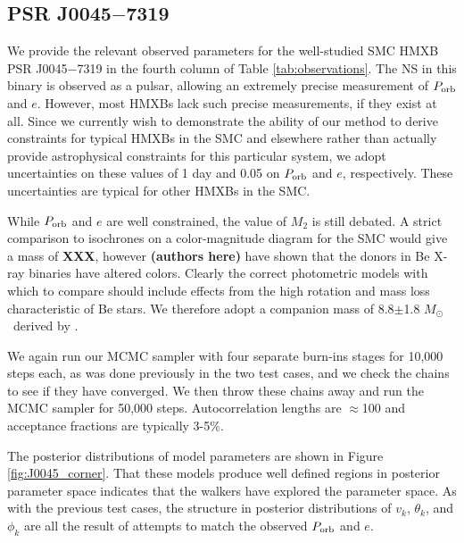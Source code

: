 \documentclass[12pt, preprint]{aastex}
\newcommand{\Msun}{\ifmmode {M_{\odot}}\else${M_{\odot}}$\fi}
\begin{document}
\subsection{PSR J0045$-$7319}


We provide the relevant observed parameters for the well-studied SMC HMXB PSR J0045$-$7319 in the fourth column of Table \ref{tab:observations}. The NS in this binary is observed as a pulsar, allowing an extremely precise measurement of $P_{\rm orb}$ and $e$. However, most HMXBs lack such precise measurements, if they exist at all. Since we currently wish to demonstrate the ability of our method to derive constraints for typical HMXBs in the SMC and elsewhere rather than actually provide astrophysical constraints for this particular system, we adopt uncertainties on these values of 1 day and 0.05 on $P_{\rm orb}$ and $e$, respectively. These uncertainties are typical for other HMXBs in the SMC. 

While $P_{\rm orb}$ and $e$ are well constrained, the value of $M_2$ is still debated. A strict comparison to isochrones on a color-magnitude diagram for the SMC would give a mass of {\bf XXX}, however {\bf (authors here)} have shown that the donors in Be X-ray binaries have altered colors. Clearly the correct photometric models with which to compare should include effects from the high rotation and mass loss characteristic of Be stars. We therefore adopt a companion mass of 8.8$\pm$1.8 \Msun\ derived by \citet{bell95}.

We again run our MCMC sampler with four separate burn-ins stages for 10,000 steps each, as was done previously in the two test cases, and we check the chains to see if they have converged. We then throw these chains away and run the MCMC sampler for 50,000 steps. Autocorrelation lengths are $\approx$100 and acceptance fractions are typically 3-5\%. 

The posterior distributions of model parameters are shown in Figure \ref{fig:J0045_corner}. That these models produce well defined regions in posterior parameter space indicates that the walkers have explored the parameter space. As with the previous test cases, the structure in posterior distributions of $v_k$, $\theta_k$, and $\phi_k$ are all the result of attempts to match the observed $P_{\rm orb}$ and $e$. 
\end{document}

